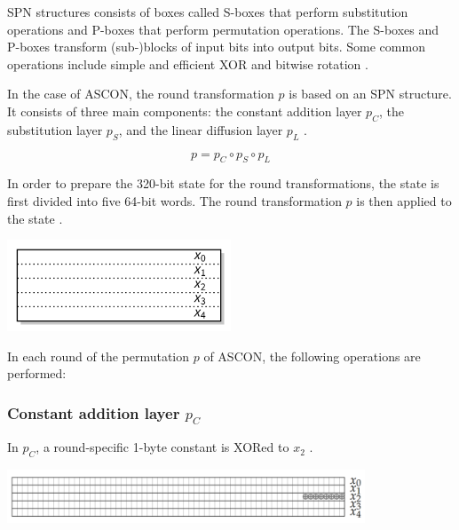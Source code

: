SPN structures consists of boxes called S-boxes that perform substitution operations and P-boxes that perform permutation operations. The S-boxes and P-boxes transform (sub-)blocks of input bits into output bits. Some common operations include simple and efficient XOR and bitwise rotation \cite{mustafeez}.

In the case of ASCON, the round transformation $p$ is based on an SPN structure. It consists of three main components: the constant addition  layer $p_C$, the substitution layer $p_S$, and the linear diffusion layer $p_L$ \cite{DBLP:journals/joc/DobraunigEMS21, ascon_specification}. \par

\[p=p_C \circ p_S \circ p_L\]

In order to prepare the 320-bit state for the round transformations, the state is first divided into five 64-bit words. The round transformation $p$ is then applied to the state \cite{DBLP:journals/joc/DobraunigEMS21}. \par 

\begin{center}
  \centering 
  \includegraphics[width=0.5\textwidth]{images/state.png}
  \label{fig:state}
\end{center}

In each round of the permutation $p$ of ASCON, the following operations are performed:

\subsubsection{Constant addition layer $p_C$}
In $p_C$, a round-specific 1-byte constant is XORed to $x_2$ \cite{ascon_specification, analysis_of_ascon}.

\begin{center}
  \centering 
  \includegraphics[width=0.8\textwidth]{images/constant.png}
  \label{fig:constant}
\end{center}

